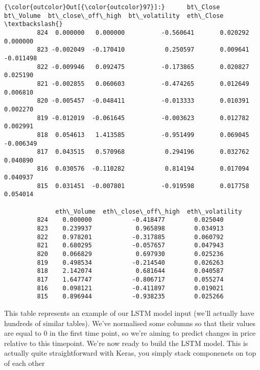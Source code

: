 \documentclass[11pt]{article}
\begin{document}
\begin{Verbatim}[commandchars=\\\{\}]
{\color{outcolor}Out[{\color{outcolor}97}]:}      bt\_Close  bt\_Volume  bt\_close\_off\_high  bt\_volatility  eth\_Close  \textbackslash{}
         824  0.000000   0.000000          -0.560641       0.020292   0.000000   
         823 -0.002049  -0.170410           0.250597       0.009641  -0.011498   
         822 -0.009946   0.092475          -0.173865       0.020827   0.025190   
         821 -0.002855   0.060603          -0.474265       0.012649   0.006810   
         820 -0.005457  -0.048411          -0.013333       0.010391   0.002270   
         819 -0.012019  -0.061645          -0.003623       0.012782   0.002991   
         818  0.054613   1.413585          -0.951499       0.069045  -0.006349   
         817  0.043515   0.570968           0.294196       0.032762   0.040890   
         816  0.030576  -0.110282           0.814194       0.017094   0.040937   
         815  0.031451  -0.007801          -0.919598       0.017758   0.054014   
         
              eth\_Volume  eth\_close\_off\_high  eth\_volatility  
         824    0.000000           -0.418477        0.025040  
         823    0.239937            0.965898        0.034913  
         822    0.978201           -0.317885        0.060792  
         821    0.680295           -0.057657        0.047943  
         820    0.066829            0.697930        0.025236  
         819    0.498534           -0.214540        0.026263  
         818    2.142074            0.681644        0.040587  
         817    1.647747           -0.806717        0.055274  
         816    0.098121           -0.411897        0.019021  
         815    0.896944           -0.938235        0.025266  
\end{Verbatim}
            
    This table represents an example of our LSTM model input (we'll actually
have hundreds of similar tables). We've normalised some columns so that
their values are equal to 0 in the first time point, so we're aiming to
predict changes in price relative to this timepoint. We're now ready to
build the LSTM model. This is actually quite straightforward with Keras,
you simply stack componenets on top of each other
\end{document}
